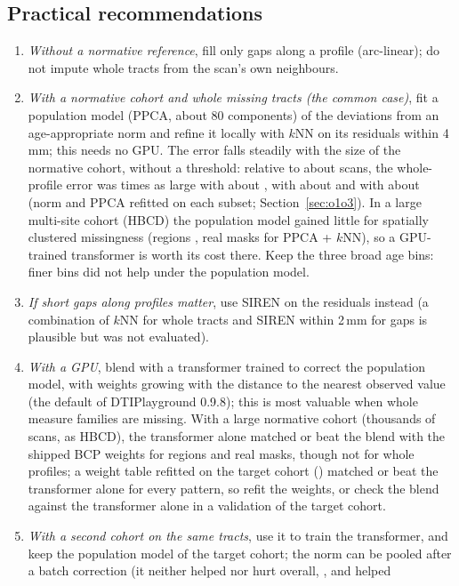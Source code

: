 \documentclass[11pt]{article}
\begin{document}
\subsection{Practical recommendations}

\begin{enumerate}
\item \emph{Without a normative reference}, fill only gaps along a profile (arc-linear); do not impute whole tracts from
the scan's own neighbours.
\item \emph{With a normative cohort and whole missing tracts (the common case)}, fit a population
model (PPCA, about 80 components) of the deviations from an age-appropriate norm and refine it locally with $k$NN on its
residuals within 4\,mm; this needs no GPU. The error falls steadily with the size of the normative cohort, without a
threshold: relative to about \oNA{} scans, the whole-profile error was \oPairQKnn{} times as large with about \oNQ, \oPairHKnn{}
with about \oNH{} and \oPairTKnn{} with about \oNT{} (norm and PPCA refitted on each subset; Section~\ref{sec:o1o3}).
In a large multi-site cohort (HBCD) the population model gained little for spatially clustered missingness (regions
\eThreeKnnRegion, real masks \rmThreeKnnIn{} for PPCA + $k$NN), so a GPU-trained transformer is worth its cost there. Keep the three broad age bins: finer bins did not
help under the population model.
\item \emph{If short gaps along profiles matter}, use SIREN on the residuals instead (a combination of $k$NN for whole tracts and SIREN within 2\,mm for gaps is plausible
but was not evaluated).
\item \emph{With a GPU}, blend with a transformer trained to correct the population model, with weights growing with the
distance to the nearest observed value (the default of DTIPlayground 0.9.8); this is most valuable when whole measure
families are missing. With a large normative cohort (thousands of scans, as HBCD), the transformer alone matched or beat the blend with the shipped BCP
weights for regions and real masks, though not for whole profiles; a weight table refitted on the target cohort
() matched or beat the transformer alone for every pattern, so refit the weights, or check
the blend against the transformer alone in a validation of the target cohort.
\item \emph{With a second cohort on the same tracts}, use it to train the transformer, and keep the population model
of the target cohort; the norm can be pooled after a batch correction (it neither helped nor hurt overall, \eFiveA, and helped

\end{enumerate}
\end{document}
